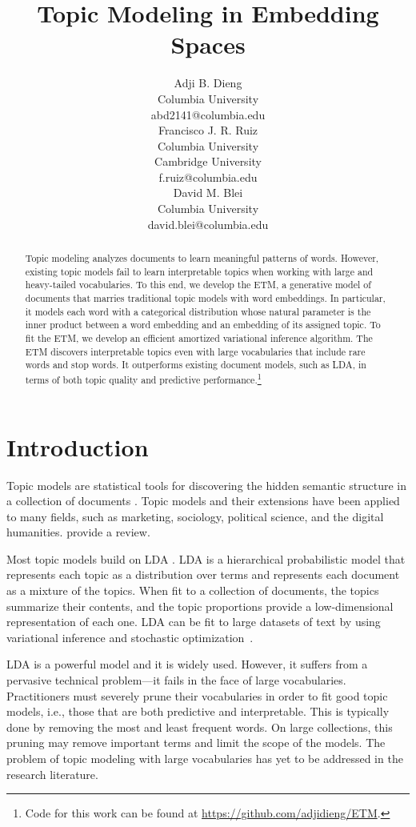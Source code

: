 \documentclass[11pt,a4paper]{article}
\title{Topic Modeling in Embedding Spaces}
\author{
 Adji B. Dieng\\
 Columbia University \\
  {\sf abd2141@columbia.edu} \\
 \And
 Francisco J. R. Ruiz\\
  Columbia University\\Cambridge University\\
  {\sf f.ruiz@columbia.edu} \\
 \And
David M. Blei\\
 Columbia University \\
   {\sf david.blei@columbia.edu} 
}
\date{}
\begin{document}
\maketitle
\begin{abstract}
  Topic modeling analyzes documents to learn meaningful patterns of
  words.  However, existing topic models fail to learn interpretable
  topics when working with large and heavy-tailed vocabularies.  To
  this end, we develop the \gls{ETM}, a generative model of documents
  that marries traditional topic models with word embeddings.  In
  particular, it models each word with a categorical distribution whose natural
  parameter is the inner product between a word embedding and an embedding
  of its assigned topic.  To fit the \gls{ETM}, we develop an
  efficient amortized variational inference algorithm.  The \gls{ETM}
  discovers interpretable topics even with large vocabularies that
  include rare words and stop words.  It outperforms existing document
  models, such as \acrlong{LDA}, in terms of both topic quality and
  predictive performance.\footnote{Code for this work can be found at \url{https://github.com/adjidieng/ETM}.}
\end{abstract}


\section{Introduction}
\label{sec:introduction}
\glsresetall

Topic models are statistical tools for discovering the hidden semantic
structure in a collection of documents
\citep{blei2003latent,blei2012probabilistic}. Topic models and their
extensions have been applied to many fields, such as marketing,
sociology, political science, and the digital humanities.
\citet{boydgraber2017applications} provide a review.

Most topic models build on \gls{LDA} \citep{blei2003latent}.
\gls{LDA} is a hierarchical probabilistic model that represents each
topic as a distribution over terms and represents each document as a
mixture of the topics. When fit to a collection of documents, the
topics summarize their contents, and the topic proportions provide a
low-dimensional representation of each one.  \gls{LDA} can be fit to
large datasets of text by using variational inference and stochastic
optimization~\citep{Hoffman2010, Hoffman2013}.

\gls{LDA} is a powerful model and it is widely used.  However, it
suffers from a pervasive technical problem---it fails in the face of
large vocabularies. Practitioners must severely prune their
vocabularies in order to fit good topic models, i.e., those that are
both predictive and interpretable.
This is typically done by removing the most and least
frequent words.
On large collections, this pruning
may remove important terms and limit the scope of the models.  The
problem of topic modeling with large vocabularies has yet to be
addressed in the research literature.
\end{document}
